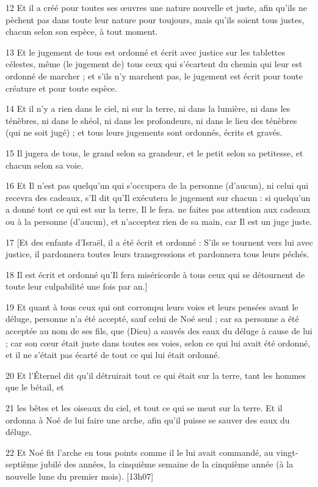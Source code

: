 \par 12 Et il a créé pour toutes ses œuvres une nature nouvelle et juste, afin qu'ils ne pèchent pas dans toute leur nature pour toujours, mais qu'ils soient tous justes, chacun selon son espèce, à tout moment.
\par 13 Et le jugement de tous est ordonné et écrit avec justice sur les tablettes célestes, même (le jugement de) tous ceux qui s'écartent du chemin qui leur est ordonné de marcher ; et s'ils n'y marchent pas, le jugement est écrit pour toute créature et pour toute espèce.
\par 14 Et il n'y a rien dans le ciel, ni sur la terre, ni dans la lumière, ni dans les ténèbres, ni dans le shéol, ni dans les profondeurs, ni dans le lieu des ténèbres (qui ne soit jugé) ; et tous leurs jugements sont ordonnés, écrits et gravés.
\par 15 Il jugera de tous, le grand selon sa grandeur, et le petit selon sa petitesse, et chacun selon sa voie.
\par 16 Et Il n'est pas quelqu'un qui s'occupera de la personne (d'aucun), ni celui qui recevra des cadeaux, s'Il dit qu'Il exécutera le jugement sur chacun : si quelqu'un a donné tout ce qui est sur la terre, Il le fera. ne faites pas attention aux cadeaux ou à la personne (d'aucun), et n'acceptez rien de sa main, car Il est un juge juste.
\par 17 [Et des enfants d'Israël, il a été écrit et ordonné : S'ils se tournent vers lui avec justice, il pardonnera toutes leurs transgressions et pardonnera tous leurs péchés.
\par 18 Il est écrit et ordonné qu'Il fera miséricorde à tous ceux qui se détournent de toute leur culpabilité une fois par an.]
\par 19 Et quant à tous ceux qui ont corrompu leurs voies et leurs pensées avant le déluge, personne n'a été accepté, sauf celui de Noé seul ; car sa personne a été acceptée au nom de ses fils, que (Dieu) a sauvés des eaux du déluge à cause de lui ; car son cœur était juste dans toutes ses voies, selon ce qui lui avait été ordonné, et il ne s'était pas écarté de tout ce qui lui était ordonné.
\par 20 Et l'Éternel dit qu'il détruirait tout ce qui était sur la terre, tant les hommes que le bétail, et
\par 21 les bêtes et les oiseaux du ciel, et tout ce qui se meut sur la terre. Et il ordonna à Noé de lui faire une arche, afin qu'il puisse se sauver des eaux du déluge.
\par 22 Et Noé fit l'arche en tous points comme il le lui avait commandé, au vingt-septième jubilé des années, la cinquième semaine de la cinquième année (à la nouvelle lune du premier mois). [13h07]
